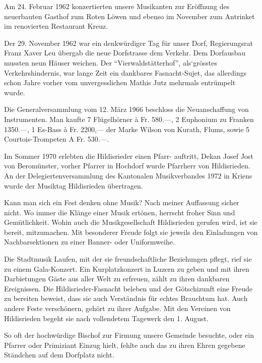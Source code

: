 \begin{multicols}{2}
    Am 24. Februar 1962 konzertierten unsere Musikanten zur Eröffnung des
    neuerbauten Gasthof zum Roten Löwen und ebenso im November zum Antrinket im
    renovierten Restaurant Kreuz.

    Der 29. November 1962 war ein denkwürdiger Tag für unser Dorf, Regierungsrat
    Franz Xaver Leu übergab die neue Dorfstrasse dem Verkehr. Dem Dorfausbau
    mussten neun Häuser weichen. Der "`Vierwaldstätterhof"', als`grösstes
    Verkehrshindernis, war lange Zeit ein dankbares Fasnacht-Sujet, das
    allerdings schon Jahre vorher vom unvergesslichen Mathis Jutz mehrmals
    entrümpelt wurde.

    Die Generalversammlung vom 12. März 1966 beschloss die Neuanschaffung von
    Instrumenten. Man kaufte 7 Flügelhörner à Fr. 580.—, 2 Euphonium zu Franken
    1350.—, 1 Es-Bass à Fr. 2200,— der Marke Wilson von Kurath, Flums, sowie 5
    Courtois-Trompeten A Fr. 530.—.

    Im Sommer 1970 erlebten die Hildisrieder einen Pfarr- auftritt, Dekan Josef
    Jost von Beromünster, vorher Pfarrer in Hochdorf wurde Pfarrherr von
    Hildisrieden. An der Delegiertenversammlung des Kantonalen Musikverbandes
    1972 in Kriens wurde der Musiktag Hildisrieden übertragen.

    Kann man sich ein Fest denken ohne Musik? Nach meiner Auffassung sicher
    nicht. Wo immer die Klänge einer Musik ertönen, herrscht froher Sinn und
    Gemütlichkeit. Wohin auch die Musikgesellschaft Hildisrieden gerufen wird,
    ist sie bereit, mitzumachen. Mit besonderer Freude folgt sie jeweils den
    Einladungen von Nachbarsektionen zu einer Banner- oder Uniformweihe.

    Die Stadtmusik Laufen, mit der sie freundschaftliche Beziehungen pflegt,
    rief sie zu einem Gala-Konzert. Ein Kurplatzkonzert in Luzern zu geben und
    mit ihren Darbietungen Gäste aus aller Welt zu erfreuen, zählt zu ihren
    dankbaren Ereignissen. Die Hildisrieder-Fasnacht beleben und der
    Götschizunft eine Freude zu bereiten beweist, dass sie auch Verständnis für
    echtes Brauchtum hat. Auch andere Feste verschönern, gehört zu ihrer
    Aufgabe. Mit den Vereinen von Hildisrieden begeht sie nach vollendetem
    Tagewerk den 1. August.

    So oft der hochwürdige Bischof zur Firmung unsere Gemeinde besuchte, oder
    ein Pfarrer oder Primiziant Einzug hielt, fehlte auch das zu ihren Ehren
    gegebene Ständchen auf dem Dorfplatz nicht.


\end{multicols}
